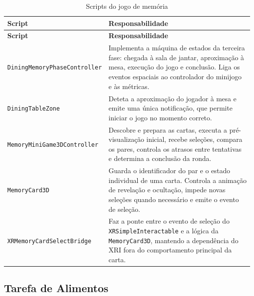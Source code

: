 \documentclass[12pt,a4paper,oneside]{report}
\begin{document}
\begin{longtable}{p{4.2cm}p{8.5cm}}
\caption{Scripts do jogo de memória}
\label{tab:scripts-memoria}\\
\toprule
\textbf{Script} & \textbf{Responsabilidade} \\
\midrule
\endfirsthead
\toprule
\textbf{Script} & \textbf{Responsabilidade} \\
\midrule
\endhead
\texttt{DiningMemoryPhaseController} &
Implementa a máquina de estados da terceira fase: chegada à sala de jantar, aproximação à mesa, execução do jogo e conclusão. Liga os eventos espaciais ao controlador do minijogo e às métricas. \\

\texttt{DiningTableZone} &
Deteta a aproximação do jogador à mesa e emite uma única notificação, que permite iniciar o jogo no momento correto. \\

\texttt{MemoryMiniGame3DController} &
Descobre e prepara as cartas, executa a pré-visualização inicial, recebe seleções, compara os pares, controla os atrasos entre tentativas e determina a conclusão da ronda. \\

\texttt{MemoryCard3D} &
Guarda o identificador do par e o estado individual de uma carta. Controla a animação de revelação e ocultação, impede novas seleções quando necessário e emite o evento de seleção. \\

\texttt{XRMemoryCardSelectBridge} &
Faz a ponte entre o evento de seleção do \texttt{XRSimpleInteractable} e a lógica da \texttt{MemoryCard3D}, mantendo a dependência do XRI fora do comportamento principal da carta. \\
\bottomrule
\end{longtable}

\subsection{Tarefa de Alimentos}
\end{document}
